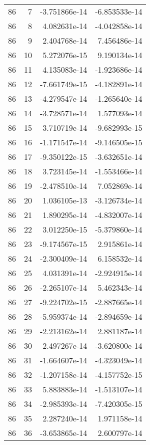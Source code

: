 \begin{tabular}{rrrr}
  86 &    7 & -3.751866e-14 & -6.853533e-14 \\
  86 &    8 &  4.082631e-14 & -4.042858e-14 \\
  86 &    9 &  2.404768e-14 &  7.456486e-14 \\
  86 &   10 &  5.272076e-15 &  9.190134e-14 \\
  86 &   11 &  4.135083e-14 & -1.923686e-14 \\
  86 &   12 & -7.661749e-15 & -4.182891e-14 \\
  86 &   13 & -4.279547e-14 & -1.265640e-14 \\
  86 &   14 & -3.728571e-14 &  1.577093e-14 \\
  86 &   15 &  3.710719e-14 & -9.682993e-15 \\
  86 &   16 & -1.171547e-14 & -9.146505e-15 \\
  86 &   17 & -9.350122e-15 & -3.632651e-14 \\
  86 &   18 &  3.723145e-14 & -1.553466e-14 \\
  86 &   19 & -2.478510e-14 &  7.052869e-14 \\
  86 &   20 &  1.036105e-13 & -3.126734e-14 \\
  86 &   21 &  1.890295e-14 & -4.832007e-14 \\
  86 &   22 &  3.012250e-15 & -5.379860e-14 \\
  86 &   23 & -9.174567e-15 &  2.915861e-14 \\
  86 &   24 & -2.300409e-14 &  6.158532e-14 \\
  86 &   25 &  4.031391e-14 & -2.924915e-14 \\
  86 &   26 & -2.265107e-14 &  5.462343e-14 \\
  86 &   27 & -9.224702e-15 & -2.887665e-14 \\
  86 &   28 & -5.959374e-14 & -2.894659e-14 \\
  86 &   29 & -2.213162e-14 &  2.881187e-14 \\
  86 &   30 &  2.497267e-14 & -3.620800e-14 \\
  86 &   31 & -1.664607e-14 & -4.323049e-14 \\
  86 &   32 & -1.207158e-14 & -4.157752e-15 \\
  86 &   33 &  5.883883e-14 & -1.513107e-14 \\
  86 &   34 & -2.985393e-14 & -7.420305e-15 \\
  86 &   35 &  2.287240e-14 &  1.971158e-14 \\
  86 &   36 & -3.653865e-14 &  2.600797e-14 \\

\end{tabular}
